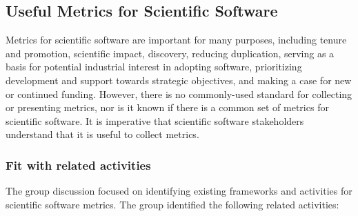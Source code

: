 \subsection{Useful Metrics for Scientific Software}
\label{sec:software-metrics}


Metrics for scientific software are important for many purposes, including tenure and promotion,
scientific impact, discovery, reducing duplication, serving as a basis for
potential industrial interest in adopting software, prioritizing development and
support towards strategic objectives, and making a case for new or continued
funding. However, there is no commonly-used standard for collecting or
presenting metrics, nor is it known if there is a common set of metrics for
scientific software. It is imperative that scientific software stakeholders
understand that it is useful to collect metrics.

\subsubsection{Fit with related activities}

The group discussion focused on identifying existing frameworks and activities
for scientific software metrics. The group identified the following related
activities:


